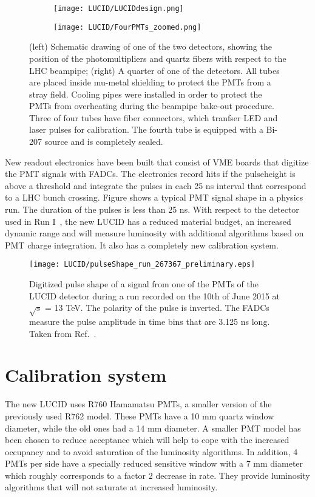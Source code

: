 \begin{figure}
\centering
\begin{subfigure}{.5\textwidth}
  \centering
  \texttt{[image: LUCID/LUCIDdesign.png]}
\end{subfigure}%
\begin{subfigure}{.5\textwidth}
  \centering
  \texttt{[image: LUCID/FourPMTs\_zoomed.png]}
\end{subfigure}
\caption{(left) Schematic drawing of one of the two detectors, showing the position of the photomultipliers 
and quartz fibers with respect to the LHC beampipe; (right) A quarter of one of the detectors. All tubes are 
placed inside mu-metal shielding to protect the PMTs from a stray field. Cooling pipes were installed in order 
to protect the PMTs from overheating during the beampipe bake-out procedure. Three of four tubes have fiber connectors, which
tranfser LED and laser pulses for calibration. The fourth tube is equipped with a Bi-207 source and is completely 
sealed.}
\label{fig:LucidDrawing}
\end{figure}


New readout electronics have been built that consist of VME boards that digitize the PMT signals with FADCs. 
The electronics record hits if the pulseheight is above a threshold and integrate the pulses in each 25 ns 
interval that correspond to a LHC bunch crossing. Figure  shows a typical PMT signal shape in 
a physics run. The duration of the pulses is less than 25 ns.
With respect to the detector used in Run I~\cite{Aad:2013ucp}, the new LUCID has a reduced material budget, 
an increased dynamic 
range and will measure luminosity with additional algorithms based on PMT charge integration. It also has a 
completely new calibration system.

\begin{figure}
\centering
\texttt{[image: LUCID/pulseShape\_run\_267367\_preliminary.eps]}
\caption{Digitized pulse shape of a signal from one of the PMTs of the LUCID detector during a run recorded on 
the 10th of June 2015 at $\sqrt{s}$ = 13 TeV. The polarity of the pulse is inverted. The FADCs measure the 
pulse amplitude in time bins that are 3.125 ns long. Taken from Ref.~\cite{publicPlots}.}
\label{fig:pulseShape}
\end{figure}

\section{Calibration system}
The new LUCID uses R760 Hamamatsu PMTs, a smaller version of the previously used R762 model. These PMTs have a 
10 mm
quartz window diameter, while the old ones had a 14 mm diameter. A smaller PMT model has been chosen to reduce acceptance 
which will help to cope with the increased occupancy and to avoid saturation of the luminosity algorithms.
In addition, 4 PMTs per side have a specially reduced sensitive window with a 7 mm diameter which roughly 
corresponds to a factor 2 decrease in rate. They provide luminosity algorithms that will not saturate at 
increased luminosity.

